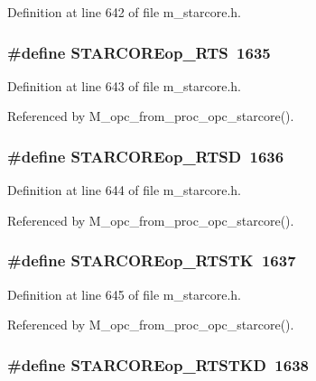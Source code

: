 Definition at line 642 of file m\_\-starcore.h.
\subsubsection{\setlength{\rightskip}{0pt plus 5cm}\#define STARCOREop\_\-RTS~1635}\label{m__starcore_8h_ab681ef1480bf986f83d8072d4bd8521}




Definition at line 643 of file m\_\-starcore.h.

Referenced by M\_\-opc\_\-from\_\-proc\_\-opc\_\-starcore().
\subsubsection{\setlength{\rightskip}{0pt plus 5cm}\#define STARCOREop\_\-RTSD~1636}\label{m__starcore_8h_e72b31f08d4eabdfde29d6b92fe707e6}




Definition at line 644 of file m\_\-starcore.h.

Referenced by M\_\-opc\_\-from\_\-proc\_\-opc\_\-starcore().
\subsubsection{\setlength{\rightskip}{0pt plus 5cm}\#define STARCOREop\_\-RTSTK~1637}\label{m__starcore_8h_1aa29dc070d5eaf21bb0cf6d8055c077}




Definition at line 645 of file m\_\-starcore.h.

Referenced by M\_\-opc\_\-from\_\-proc\_\-opc\_\-starcore().
\subsubsection{\setlength{\rightskip}{0pt plus 5cm}\#define STARCOREop\_\-RTSTKD~1638}\label{m__starcore_8h_af4c0ac8feabf65a5511f1bbe1bb1d61}




